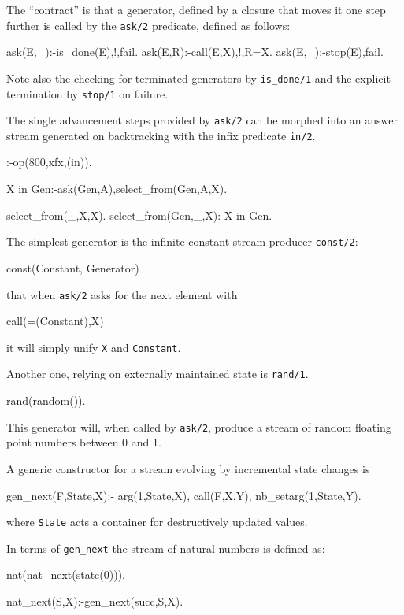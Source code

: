 \documentclass{new_tlp}
\begin{document}
The ``contract'' is that a generator, defined by a closure that moves it one step further is called by the {\tt ask/2} predicate, defined as follows:
\begin{code}
ask(E,_):-is_done(E),!,fail.
ask(E,R):-call(E,X),!,R=X.
ask(E,_):-stop(E),fail.
\end{code}
Note also the checking for terminated generators by {\tt is\_done/1} and the explicit termination by {\tt stop/1} on failure.

The single advancement steps provided by {\tt ask/2} can be morphed into an answer stream generated on backtracking with the infix predicate {\tt in/2}.
\begin{code}
:-op(800,xfx,(in)).

X in Gen:-ask(Gen,A),select_from(Gen,A,X).

select_from(_,X,X).
select_from(Gen,_,X):-X in Gen.
\end{code}

The simplest generator is the infinite constant stream producer {\tt const/2}:
\begin{codex}
const(Constant, Generator)
\end{codex}
that when {\tt ask/2} asks for the next element with
\begin{codex}
call(=(Constant),X)
\end{codex}
it will simply unify {\tt X} and {\tt Constant}.

Another one, relying on externally maintained state is {\tt rand/1}.
\begin{code}
rand(random()).
\end{code}
This generator will, when called by {\tt ask/2}, produce a stream of random floating point numbers between 0 and 1.

A generic constructor for a stream evolving by incremental state changes is
\begin{code}
gen_next(F,State,X):-
  arg(1,State,X),
  call(F,X,Y),
  nb_setarg(1,State,Y).
\end{code}
where {\tt State} acts a container for destructively updated values.



In terms of {\tt gen\_next} the stream of natural numbers is defined as:
\begin{code}
nat(nat_next(state(0))).

nat_next(S,X):-gen_next(succ,S,X).
\end{code}
\end{document}

